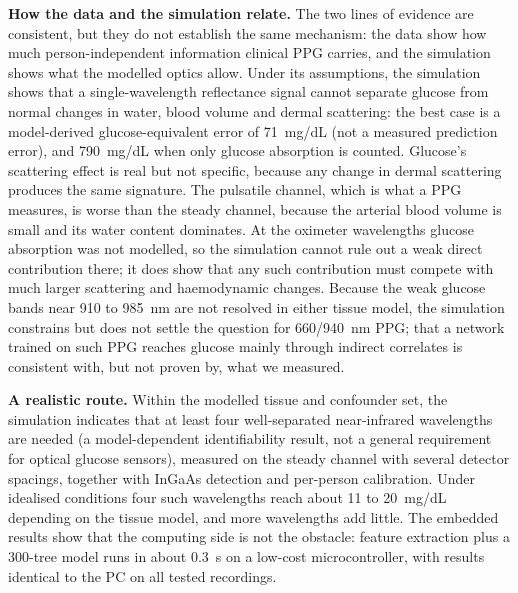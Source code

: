\documentclass[11pt]{article}
\newcommand{\mgdl}{mg/dL}
\begin{document}
\textbf{How the data and the simulation relate.} The two lines of evidence are consistent, but they do not establish the same mechanism: the data show how much person-independent information clinical PPG carries, and the simulation shows what the modelled optics allow. Under its assumptions, the simulation shows that a single-wavelength reflectance signal cannot separate glucose from normal changes in water, blood volume and dermal scattering: the best case is a model-derived glucose-equivalent error of 71~\mgdl{} (not a measured prediction error), and 790~\mgdl{} when only glucose absorption is counted. Glucose's scattering effect is real but not specific, because any change in dermal scattering produces the same signature. The pulsatile channel, which is what a PPG measures, is worse than the steady channel, because the arterial blood volume is small and its water content dominates. At the oximeter wavelengths glucose absorption was not modelled, so the simulation cannot rule out a weak direct contribution there; it does show that any such contribution must compete with much larger scattering and haemodynamic changes. Because the weak glucose bands near 910 to 985~nm are not resolved in either tissue model, the simulation constrains but does not settle the question for 660/940~nm PPG; that a network trained on such PPG reaches glucose mainly through indirect correlates is consistent with, but not proven by, what we measured.

\textbf{A realistic route.} Within the modelled tissue and confounder set, the simulation indicates that at least four well-separated near-infrared wavelengths are needed (a model-dependent identifiability result, not a general requirement for optical glucose sensors), measured on the steady channel with several detector spacings, together with InGaAs detection and per-person calibration. Under idealised conditions four such wavelengths reach about 11 to 20~\mgdl{} depending on the tissue model, and more wavelengths add little. The embedded results show that the computing side is not the obstacle: feature extraction plus a 300-tree model runs in about 0.3~s on a low-cost microcontroller, with results identical to the PC on all tested recordings.
\end{document}

